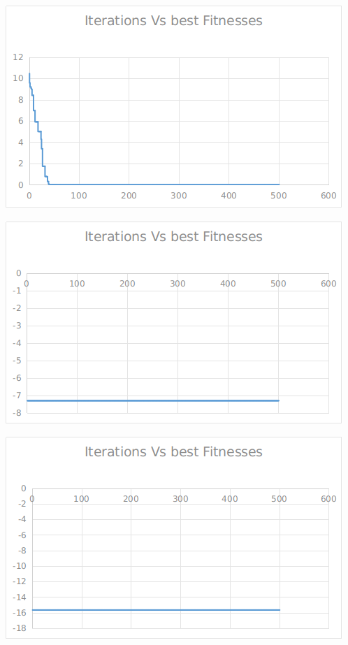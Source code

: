 \documentclass[12pt]{article}
\begin{document}
				\hfill
				\begin{minipage}{0.6\linewidth}
					\includegraphics[width=\linewidth]{12.png}
				\end{minipage}
				\begin{minipage}{0.6\linewidth}
					\includegraphics[width=\linewidth]{13.png}
				\end{minipage}
				\hfill
				\begin{minipage}{0.6\linewidth}
					\includegraphics[width=\linewidth]{14.png}
				\end{minipage}
\end{document}
